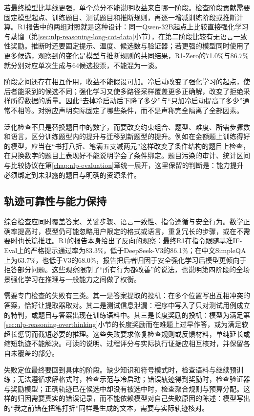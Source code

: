 若最终模型比基线更强，单个总分不能说明收益来自哪一阶段。检查阶段贡献需要固定模型起点、训练题目、测试题目和推断规则，再逐一增减训练阶段或推断计算。R1报告中的两组对照就是这种设计：同一Qwen-32B起点上比较直接强化学习与蒸馏（第\ref{sec:nlp-reasoning-long-cot-data}小节），在第二阶段比较有无语言一致性奖励。推断时还要固定提示、温度、候选数与验证器；若更强的模型同时使用了更多候选，观察到的变化是模型与推断规则的共同结果，R1-Zero的71.0\%与86.7\%就分别对应单次生成与64候选投票，不能混为一谈。

阶段之间还存在相互作用，收益不能假设可加。冷启动改变了强化学习的起点，使后者能采到的候选不同；强化学习又使多路径采样覆盖更多正确解，改变了拒绝采样所得数据的质量。因此“去掉冷启动后下降了多少”与“只加冷启动提高了多少”通常不相等。对照应声明实际固定了哪些条件，而不是声称完全隔离了全部因素。

泛化检查不只是替换题目中的数字，而要改变约束组合、题型、难度、所需步骤数和语言，区分训练题型内的提升与迁移到新题型的提升。例如在金额题上训练得好的模型，应当在“书打八折、笔满五支减两元”这样改变了条件结构的题目上检查，在只换数字的题目上表现好不能说明学会了条件绑定。题目污染的审计、统计区间与比较协议在第\ref{chap:nlp-evaluation}章统一展开，这里保留的判断是：能力提升必须绑定到未泄露的题目与明确的资源条件。

\subsection{轨迹可靠性与能力保持}
\label{sec:nlp-reasoning-reliability}

综合检查应同时覆盖答案、关键步骤、语言一致性、指令遵循与安全行为。数学正确率提高时，模型仍可能忽略用户限定的格式或语言，重复冗长的步骤，或在不需要时也长篇推理。R1的报告本身给出了反向的观察：最终R1在指令跟随基准IF-Eval上的严格提示通过率为83.3\%，低于DeepSeek-V3的86.1\%；在中文SimpleQA上为63.7\%，也低于V3的68.0\%，报告把后者归因于安全强化学习后模型更倾向于拒答部分问题。这些观察限制了“所有行为都改善”的说法，也说明第四阶段的全场景强化学习在推理与一般能力之间做了权衡。

需要专门检查的失败有三类。其一是答案提取的投机：在多个位置写出互相冲突的答案，恰好让提取器取对。其二是测试信息泄漏：程序中写入了只对测试用例成立的特判，或题目与答案出现在训练语料中。其三是长度奖励的投机：模型为满足第\ref{sec:nlp-reasoning-overthinking}小节的长度奖励而在难题上过早作答，或为满足软超长惩罚而截短必要的推理。这些失败要求修复检查规则或反馈材料，单纯延长或缩短轨迹不能解决。可读的说明、过程评分与实际执行证据应相互核对，并保留各自未覆盖的部分。

失败定位最终要回到具体的阶段。缺少知识和符号模式时，检查语料与继续预训练；无法遵循求解格式时，检查示范与冷启动；错误轨迹得到奖励时，检查验证器与奖励模型；正确轨迹已在候选中却没有被选中时，检查聚合规则与预算分配。这样的归因需要真实的错误记录，而不能依赖模型对自己失败原因的陈述：模型写出的“我之前错在把笔打折”同样是生成的文本，需要与实际轨迹核对。

